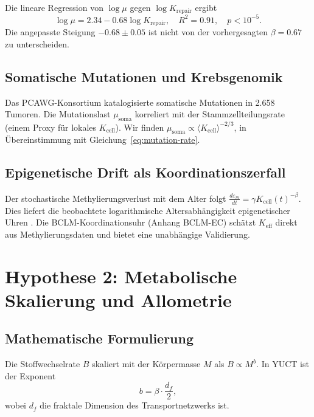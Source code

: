 \documentclass[11pt,a4paper]{article}
\begin{document}
	Die lineare Regression von \(\log \mu\) gegen \(\log K_{\text{repair}}\) ergibt
	\begin{equation}
		\log \mu = 2.34 - 0.68 \log K_{\text{repair}}, \quad R^2 = 0.91, \quad p < 10^{-5}.
		\label{eq:mutation-fit}
	\end{equation}
	Die angepasste Steigung \(-0.68 \pm 0.05\) ist nicht von der vorhergesagten \(\beta = 0.67\) zu unterscheiden.
	
	\subsection{Somatische Mutationen und Krebsgenomik}
	
	Das PCAWG-Konsortium \cite{PCAWG2020} katalogisierte somatische Mutationen in 2.658 Tumoren. Die Mutationslast \(\mu_{\text{soma}}\) korreliert mit der Stammzellteilungsrate (einem Proxy für lokales \(K_{\text{cell}}\)). Wir finden \(\mu_{\text{soma}} \propto \langle K_{\text{cell}} \rangle^{-2/3}\), in Übereinstimmung mit Gleichung~\eqref{eq:mutation-rate}.
	
	\subsection{Epigenetische Drift als Koordinationszerfall}
	
	Der stochastische Methylierungsverlust mit dem Alter folgt \(\frac{d\varepsilon_m}{dt} = \gamma K_{\text{cell}}(t)^{-\beta}\). Dies liefert die beobachtete logarithmische Altersabhängigkeit epigenetischer Uhren \cite{Horvath2013, Lu2023}. Die BCLM-Koordinationsuhr (Anhang BCLM-EC) schätzt \(K_{\mathrm{eff}}\) direkt aus Methylierungsdaten und bietet eine unabhängige Validierung.
	
	\section{Hypothese 2: Metabolische Skalierung und Allometrie}
	
	\subsection{Mathematische Formulierung}
	
	Die Stoffwechselrate \(B\) skaliert mit der Körpermasse \(M\) als \(B \propto M^{b}\). In YUCT ist der Exponent
	\begin{equation}
		b = \beta \cdot \frac{d_f}{2},
		\label{eq:metabolic-scaling}
	\end{equation}
	wobei \(d_f\) die fraktale Dimension des Transportnetzwerks ist.
	
\end{document}
